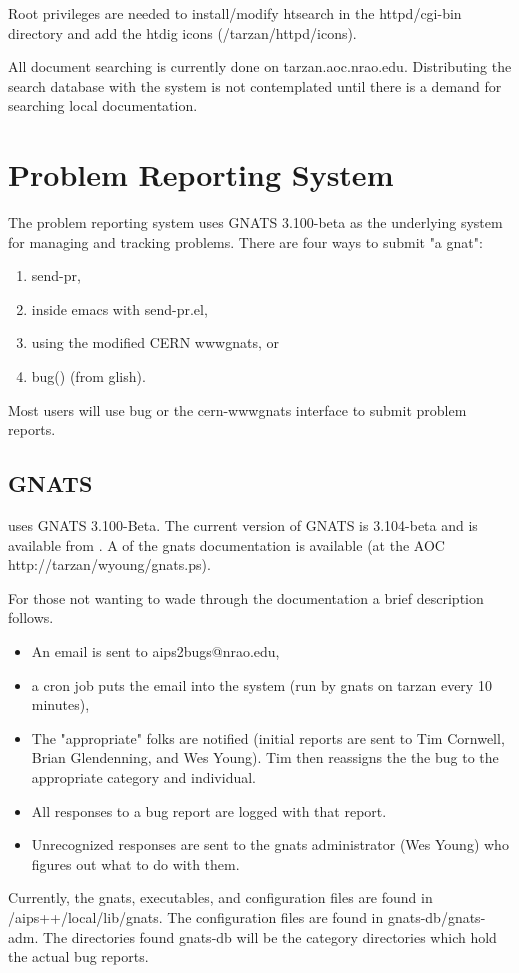 Root privileges are needed to install/modify htsearch in the httpd/cgi-bin
directory and add the htdig icons (/tarzan/httpd/icons).

All document searching is currently done on tarzan.aoc.nrao.edu.  Distributing
the search database with the system is not contemplated until there is a
demand for searching local documentation.

\section{\aips Problem Reporting System}
The \aips problem reporting system uses GNATS 3.100-beta as the underlying
system for managing and tracking problems. There are four ways to submit
"a gnat":
\begin{enumerate}
\item send-pr,
\item inside emacs with send-pr.el, 
\item using the modified CERN wwwgnats, or
\item bug() (from glish).
\end{enumerate} 
Most \aips users will use bug or the cern-wwwgnats interface to submit problem
reports.
\subsection{GNATS}
\aips uses GNATS 3.100-Beta.  The current version of
GNATS is 3.104-beta and is available from
.
A  of
the gnats documentation is available (at the AOC http://tarzan/wyoung/gnats.ps).

For those not wanting to wade through the documentation a brief
description follows.
\begin{itemize}
\item An email is sent to aips2bugs@nrao.edu,
\item a cron job puts the email into the system (run by gnats on tarzan every
10 minutes),
\item The "appropriate" folks are notified (initial reports are sent to Tim
Cornwell, Brian Glendenning,
and Wes Young). Tim then reassigns the the bug to the appropriate category and
individual.
\item All responses to a bug report are logged with that report.
\item Unrecognized responses are sent to the gnats administrator (Wes Young)
who figures out what to do
with them.
\end{itemize}
Currently, the gnats, executables, and configuration files are found in 
/aips++/local/lib/gnats.  The configuration files are found in
gnats-db/gnats-adm.
The directories found gnats-db will be the category directories which hold the
actual bug reports.
